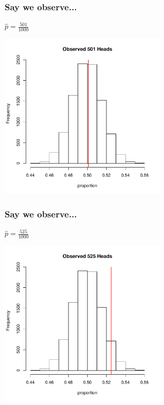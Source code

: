 \documentclass[handout]{beamer}
\begin{document}
\begin{frame}
\frametitle{Say we observe...}
$\widehat{p} = \frac{501}{1000}$
\begin{center}
\includegraphics[width=0.6\textwidth]{figure/hist2}
\end{center}
\end{frame}


\begin{frame}
\frametitle{Say we observe...}
$\widehat{p} = \frac{525}{1000}$
\begin{center}
\includegraphics[width=0.6\textwidth]{figure/hist3}
\end{center}
\end{frame}
\end{document}
